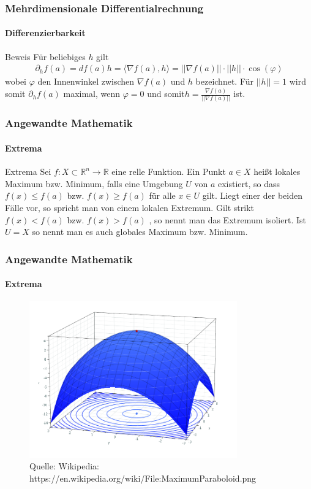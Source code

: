 \documentclass{beamer}
\begin{document}
    \begin{frame}
        \frametitle{Mehrdimensionale Differentialrechnung}
    \framesubtitle{Differenzierbarkeit}
        \begin{block}{Beweis}
    Für beliebiges $h$ gilt 
    \begin{align*}
    \partial_h f(a) = df(a) h = \langle \nabla f(a) , h \rangle = || \nabla f(a)||  \cdot ||h|| \cdot \cos(\varphi) 
    \end{align*} 
    wobei $\varphi$ den Innenwinkel zwischen $\nabla f(a)$ und $h$ bezeichnet. Für $||h|| = 1$ wird somit $\partial_h f(a) $ maximal, wenn $\varphi = 0$ und somit$h =  \frac{\nabla f(a)}{||\nabla f(a)||}$ ist.
    \end{block}
    
     \end{frame}
    



\begin{frame}
    \frametitle{Angewandte Mathematik}
\framesubtitle{Extrema}
    \begin{block}{Extrema}
Sei $f : X \subset \mathbb{R}^n \to \mathbb{R}$ eine relle Funktion.  Ein Punkt $a \in  X$ heißt lokales Maximum bzw. Minimum, falls eine Umgebung $U$ von $a$ existiert, so dass $f(x) \leq f(a)$ bzw.  $f(x) \geq f(a)$ für alle $x \in U$ gilt. Liegt einer der beiden Fälle vor, so spricht man von einem lokalen Extremum. Gilt strikt $f(x) <  f(a)$ bzw.  $f(x) > f(a)$ , so nennt man das Extremum isoliert. Ist $U = X$ so nennt man es auch globales Maximum bzw. Minimum.
\end{block}
 \end{frame}


\begin{frame}
    \frametitle{Angewandte Mathematik}
\framesubtitle{Extrema}

\begin{figure}[H]
      \centering
    \includegraphics[width=0.8\textwidth]{images/MaximumParaboloid}
      \caption{Quelle: Wikipedia: https://en.wikipedia.org/wiki/File:MaximumParaboloid.png}
   \end{figure}
 \end{frame}
\end{document}

